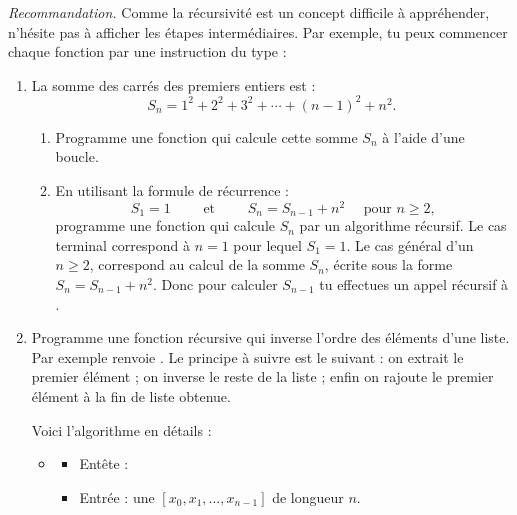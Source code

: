 \documentclass[11pt,class=report,crop=false]{standalone}
\begin{document}
\begin{activite}
   


\emph{Recommandation.} Comme la récursivité est un concept difficile à appréhender, 
n'hésite pas à afficher les étapes intermédiaires. Par exemple, tu peux commencer chaque fonction par une instruction du type :

\begin{enumerate}
  \item La somme des carrés des premiers entiers est :
  $$S_n = 1^2 + 2^2 + 3^2 +\cdots + (n-1)^2 + n^2.$$
  
  \begin{enumerate}
    \item Programme une fonction 
    qui calcule cette somme $S_n$ à l'aide d'une boucle.
    
    \item En utilisant la formule de récurrence :
    $$S_1 = 1 \qquad \text{ et } \qquad S_n = S_{n-1} + n^2 \quad \text{ pour } n \ge 2,$$
    programme une fonction  qui calcule $S_n$ par un algorithme récursif.
	Le cas terminal correspond à $n=1$ pour lequel $S_1=1$.
	Le cas général d'un $n \ge 2$, correspond au calcul de la somme $S_n$,
	écrite sous la forme $S_n = S_{n-1} + n^2$. Donc pour calculer $S_{n-1}$ tu effectues un appel récursif à .
  \end{enumerate}	    
     
    
  \item  Programme une fonction récursive  qui inverse l'ordre des éléments d'une liste. Par exemple  renvoie \ci{[5,4,3,2,1]}.
  Le principe à suivre est le suivant :
  on extrait le premier élément ; on inverse le reste de la liste ; enfin on rajoute le premier élément à la fin de liste obtenue.
  

  
  Voici l'algorithme en détails :
\begin{algorithme}
\sauteligne 
  
\begin{itemize}
  \item 
  \begin{itemize}
   \item Entête : 
   \item Entrée : une  $[x_0,x_1,\ldots,x_{n-1}]$ de longueur $n$.
   

\end{itemize}
\end{itemize}
\end{algorithme}
\end{enumerate}
\end{activite}
\end{document}
